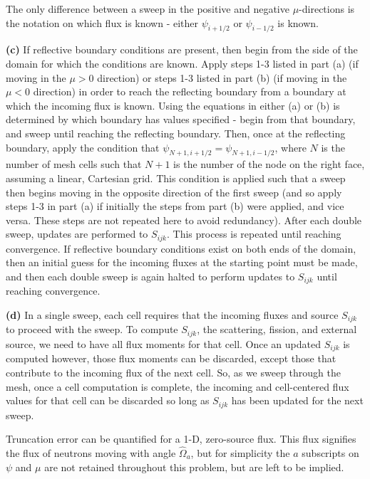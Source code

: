 \documentclass[10pt]{article}
\newcommand*\circled[1]{\tikz[baseline=(char.base)]{
            \node[shape=circle,draw,inner sep=2pt] (char) {#1};}}
\begin{document}
The only difference between a sweep in the positive and negative \(\mu\)-directions is the notation on which flux is known - either \(\psi_{i+1/2}\) or \(\psi_{i-1/2}\) is known.\newline

\textbf{(c)} If reflective boundary conditions are present, then begin from the side of the domain for which the conditions are known. Apply steps 1-3 listed in part (a) (if moving in the \(\mu>0\) direction) or steps 1-3 listed in part (b) (if moving in the \(\mu<0\) direction) in order to reach the reflecting boundary from a boundary at which the incoming flux is known. Using the equations in either (a) or (b) is determined by which boundary has values specified - begin from that boundary, and sweep until reaching the reflecting boundary. Then, once at the reflecting boundary, apply the condition that \(\psi_{N+1, i+1/2}=\psi_{N+1, i-1/2}\), where \(N\) is the number of mesh cells such that \(N+1\) is the number of the node on the right face, assuming a linear, Cartesian grid. This condition is applied such that a sweep then begins moving in the opposite direction of the first sweep (and so apply steps 1-3 in part (a) if initially the steps from part (b) were applied, and vice versa. These steps are not repeated here to avoid redundancy). After each double sweep, updates are performed to \(S_{ijk}\). This process is repeated until reaching convergence. If reflective boundary conditions exist on both ends of the domain, then an initial guess for the incoming fluxes at the starting point must be made, and then each double sweep is again halted to perform updates to \(S_{ijk}\) until reaching convergence.\newline

\textbf{(d)} In a single sweep, each cell requires that the incoming fluxes and source \(S_{ijk}\) to proceed with the sweep. To compute \(S_{ijk}\), the scattering, fission, and external source, we need to have all flux moments for that cell. Once an updated \(S_{ijk}\) is computed however, those flux moments can be discarded, except those that contribute to the incoming flux of the next cell. So, as we sweep through the mesh, once a cell computation is complete, the incoming and cell-centered flux values for that cell can be discarded so long as \(S_{ijk}\) has been updated for the next sweep.\newline

\circled{2} Truncation error can be quantified for a 1-D, zero-source flux. This flux signifies the flux of neutrons moving with angle \(\hat{\Omega}_a\), but for simplicity the \(a\) subscripts on \(\psi\) and \(\mu\) are not retained throughout this problem, but are left to be implied.\newline
\end{document}

